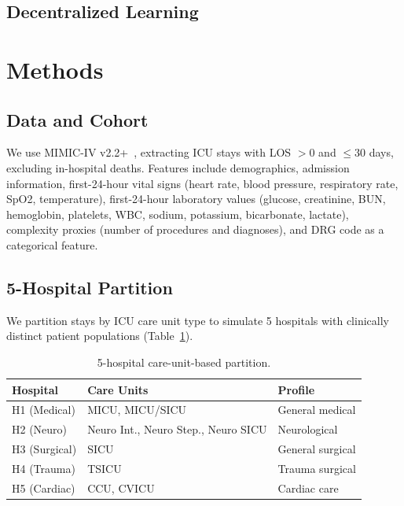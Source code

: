 \documentclass[conference]{IEEEtran}
\begin{document}

\subsection{Decentralized Learning}



\section{Methods}
\label{sec:methods}

\subsection{Data and Cohort}

We use MIMIC-IV v2.2+~\cite{johnson2023mimic}, extracting ICU stays with LOS $> 0$ and $\leq 30$ days, excluding in-hospital deaths. Features include demographics, admission information, first-24-hour vital signs (heart rate, blood pressure, respiratory rate, SpO2, temperature), first-24-hour laboratory values (glucose, creatinine, BUN, hemoglobin, platelets, WBC, sodium, potassium, bicarbonate, lactate), complexity proxies (number of procedures and diagnoses), and DRG code as a categorical feature.

\subsection{5-Hospital Partition}

We partition stays by ICU care unit type to simulate 5 hospitals with clinically distinct patient populations (Table~\ref{tab:partition}).

\begin{table}[h]
\centering
\caption{5-hospital care-unit-based partition.}
\label{tab:partition}
\begin{tabular}{lll}
\toprule
Hospital & Care Units & Profile \\
\midrule
H1 (Medical) & MICU, MICU/SICU & General medical \\
H2 (Neuro) & Neuro Int., Neuro Step., Neuro SICU & Neurological \\
H3 (Surgical) & SICU & General surgical \\
H4 (Trauma) & TSICU & Trauma surgical \\
H5 (Cardiac) & CCU, CVICU & Cardiac care \\
\bottomrule
\end{tabular}
\end{table}
\end{document}
